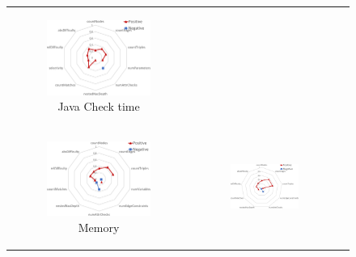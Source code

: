 \begin{figure}[tp]
\begin{center}
\begin{tabular}{c c c}
\begin{subfigure}[t]{0.31\textwidth}
	    \includegraphics[width=0.95\textwidth]{figures/spider-java-check.pdf}
	    \caption{Java Check time}\end{subfigure} \\
	    \begin{subfigure}[t]{0.31\textwidth}\centering
	    \includegraphics[width=0.95\textwidth]{figures/spider-iq-memory.pdf}
	    \caption{\incquery{} Memory}\end{subfigure} &
	    \begin{subfigure}[t]{0.31\textwidth}\centering
	    \includegraphics[width=0.95\textwidth]{figures/spider-iq-read.pdf}

\end{subfigure}
\end{tabular}
\end{center}
\end{figure}
